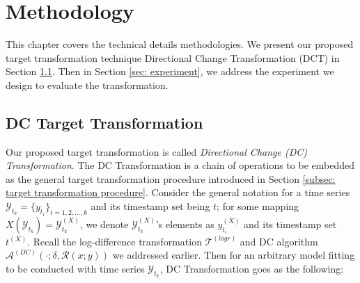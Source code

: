 \chapter{Methodology}\label{ch: methodology}
This chapter covers the technical details methodologies. We present our proposed target transformation technique Directional Change Transformation (DCT) in Section \ref{sec: dc transformation}. Then in Section \ref{sec: experiment}, we address the experiment we design to evaluate the transformation.

\section{DC Target Transformation}\label{sec: dc transformation}
Our proposed target transformation is called \textit{Directional Change (DC) Transformation}. The DC Transformation is a chain of operations to be embedded as the general target transformation procedure introduced in Section \ref{subsec: target transformation procedure}. Consider the general notation for a time series $\mathcal{Y}_{t_k} = \{y_{t_i}\}_{i = 1, 2, \ldots, k}$ and its timestamp set being $t$; for some mapping $X (\mathcal{Y}_{t_k}) = \mathcal{Y}^{(X)}_{t_k}$, we denote $\mathcal{Y}^{(X)}_{t_k}$'s elements as $y^{(X)}_{t_i}$ and its timestamp set $t^{(X)}$. Recall the log-difference transformation $\mathcal{T}^{(logr)}$ and DC algorithm $\mathcal{A}^{(DC)} (\cdot; \delta, \mathcal{R} (x; y))$ we addressed earlier. Then for an arbitrary model fitting to be conducted with time series $\mathcal{Y}_{t_k}$, DC Transformation goes as the following:

